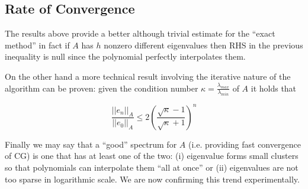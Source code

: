 \documentclass[12pt]{article}
\newcommand{\1}{\mathbbm{1}}
\begin{document}
\subsection{Rate of Convergence}
The results above provide a better although trivial estimate for the ``exact method'' in fact if $A$ has $h$ nonzero different eigenvalues then RHS in the previous inequality is null since the polynomial perfectly interpolates them.

On the other hand a more technical result involving the iterative nature of the algorithm can be proven: given the condition number $\kappa = \frac{\lambda_{max}}{\lambda_{min}}$ of $A$ it holds that

$$ \frac{||e_n||_A}{||e_0||_A} \leq 2 \left(\frac{\sqrt{\kappa} - 1}{\sqrt{\kappa} + 1}\right)^n $$

Finally we may say that a ``good'' spectrum for $A$ (i.e. providing fast convergence of CG) is one that has at least one of the two: (i) eigenvalue forms small clusters so that polynomials can interpolate them ``all at once'' or (ii) eigenvalues are not too sparse in logarithmic scale. We are now confirming this trend experimentally. 

\section{}

  
  

\end{document}

